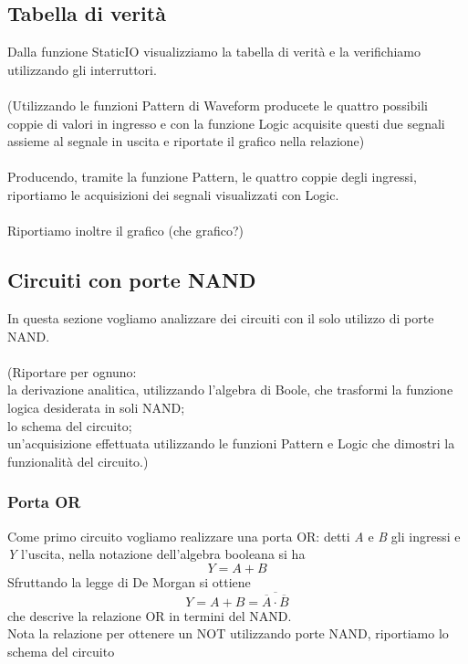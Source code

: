 \documentclass[10pt, a4paper, italian]{article}
\begin{document}
\subsection{Tabella di verità}
Dalla funzione StaticIO visualizziamo la tabella di verità e la verifichiamo utilizzando gli interruttori.\\
\\
(Utilizzando le funzioni Pattern di Waveform producete le quattro possibili coppie di valori in ingresso e con la funzione Logic acquisite questi due segnali assieme al segnale in uscita e riportate il grafico nella relazione)\\
\\
Producendo, tramite la funzione Pattern, le quattro coppie degli ingressi, riportiamo le acquisizioni dei segnali visualizzati con Logic.\\
\\
Riportiamo inoltre il grafico (che grafico?)

\subsection{Circuiti con porte NAND}
In questa sezione vogliamo analizzare dei circuiti con il solo utilizzo di porte NAND.\\
\\
(Riportare per ognuno:\\
la derivazione analitica, utilizzando l'algebra di Boole, che trasformi la funzione logica desiderata in soli NAND;\\
lo schema del circuito;\\
un'acquisizione effettuata utilizzando le funzioni Pattern e Logic che dimostri la funzionalità del circuito.)

\subsubsection*{Porta OR}
Come primo circuito vogliamo realizzare una porta OR: detti \textit{A} e \textit{B} gli ingressi e \textit{Y} l'uscita, nella notazione dell'algebra booleana si ha
\[
    Y=A+B
\]
Sfruttando la legge di De Morgan si ottiene
\[
    Y=A+B=\overline{\overline{A}\cdot\overline{B}}
\]
che descrive la relazione OR in termini del NAND.\\
Nota la relazione per ottenere un NOT utilizzando porte NAND, riportiamo lo schema del circuito
\begin{figure}[htb!]
    \centering
    \label{or}
\end{figure}
\end{document}
